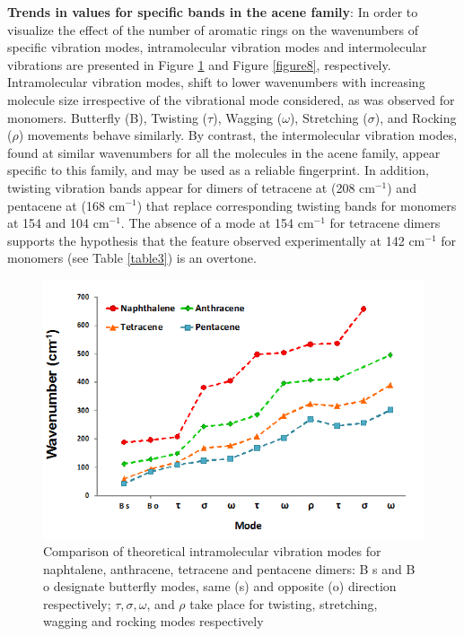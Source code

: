 \textbf{Trends in values for specific bands in the acene family}: In order to visualize the effect of the number of aromatic rings on the wavenumbers of specific vibration modes, intramolecular vibration modes and intermolecular vibrations are presented in Figure \ref{figure7} and Figure \ref{figure8}, respectively. Intramolecular vibration modes, shift to lower wavenumbers with increasing molecule size irrespective of the vibrational mode considered, as was observed for monomers. Butterfly (B), Twisting ($\tau$), Wagging ($\omega$), Stretching ($\sigma$), and Rocking ($\rho$) movements behave similarly. By contrast, the intermolecular vibration modes, found at similar wavenumbers for all the molecules in the acene family, appear specific to this family, and may be used as a reliable fingerprint. In addition, twisting vibration bands appear for dimers of tetracene at (208 cm$^{-1}$) and pentacene at (168 cm$^{-1}$) that replace corresponding twisting bands for monomers at 154 and 104 cm$^{-1}$. The absence of a mode at 154 cm$^{-1}$ for tetracene dimers supports the hypothesis that the feature observed experimentally at 142 cm$^{-1}$ for monomers (see Table \ref{table3}) is an overtone.

\begin{figure}[h]
	\centering
	\includegraphics[scale=0.85]{image/intramolecular-v}
	\caption[Comparison of theoretical intramolecular vibration modes for acenes dimers]{Comparison of theoretical intramolecular vibration modes for naphtalene, anthracene, tetracene and pentacene dimers: B s and B o designate butterfly modes, same (s) and opposite (o) direction respectively; $\tau, \sigma, \omega$, and $\rho$ take place for twisting, stretching, wagging and rocking modes respectively} \label{figure7}
\end{figure}

